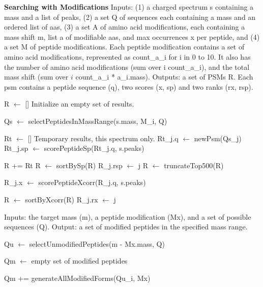 \documentclass[12pt]{article}
\begin{document}
\begin{algorithm}
\caption{{\bf Searching with Modifications} Inputs: (1) a charged
  spectrum s containing a mass and a list of peaks, (2) a set Q of
  sequences each containing a mass and an ordered list of aas, (3) a
  set A of amino acid modifications, each containing a mass shift m,
  list a of modifiable aas, and max occurrences x per peptide, and (4)
  a set M of peptide modifications.  Each peptide modification
  contains a set of amino acid modifications, represented as
  count\_a\_i for i in 0 to 10. It also has the number of amino acid
  modifications (sum over i count\_a\_i), and the total mass shift
  (sum over $i$ count\_a\_i * a\_i.mass). Outputs: a set of PSMs R.
  Each psm contains a peptide sequence (q), two scores (x, sp) and
  two ranks (rx, rsp).}

\begin{algorithmic}[1]

\State R $\gets$ []
\Comment Initialize an empty set of results.

   \State Qs $\gets$ selectPeptidesInMassRange(s.mass, M\_i, Q)

   \State Rt $\gets$ []
   \Comment Temporary results, this spectrum only.
     \State Rt\_j.q $\gets$ newPsm(Qs\_j)
     \State Rt\_j.sp $\gets$ scorePeptideSp(Rt\_j.q, s.peaks)
   \EndFor

   \State R += Rt
   \State R $\gets$ sortBySp(R)
     \State R\_j.rsp $\gets$ j
   \EndFor
   \State R $\gets$ truncateTop500(R)

     \State R\_j.x $\gets$ scorePeptideXcorr(R\_j.q, s.peaks)
   \EndFor

   \State R $\gets$ sortByXcorr(R)
     \State R\_j.rx $\gets$ j
   \EndFor

\EndFor

\State {}
\EndProcedure
\end{algorithmic}
\end{algorithm}

\begin{algorithm}
\caption{ Inputs: the target mass (m), a peptide modification (Mx),
  and a set of possible sequences (Q).  Output: a set of modified
  peptides in the specified mass range.}

\begin{algorithmic}[1]
  \State Qu $\gets$ selectUnmodifiedPeptides(m - Mx.mass, Q)
   
  \State Qm $\gets$ empty set of modified peptides

      \State Qm += generateAllModifiedForms(Qu\_i, Mx)
    \EndIf
  \EndFor

  \State {}
\EndProcedure
\end{algorithmic}
\end{algorithm}
\end{document}
